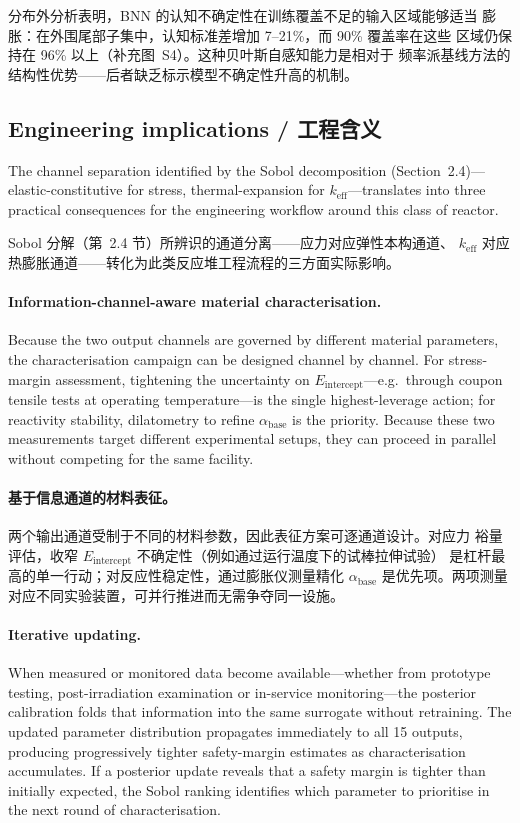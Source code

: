 \documentclass[11pt,a4paper]{article}
\newcommand{\keff}{\ensuremath{k_{\mathrm{eff}}}}
\newcommand{\Eint}{\ensuremath{E_{\mathrm{intercept}}}}
\newcommand{\abase}{\ensuremath{\alpha_{\mathrm{base}}}}
\begin{document}
分布外分析表明，BNN 的认知不确定性在训练覆盖不足的输入区域能够适当
膨胀：在外围尾部子集中，认知标准差增加 7--21\%，而 90\% 覆盖率在这些
区域仍保持在 96\% 以上（补充图~S4）。这种贝叶斯自感知能力是相对于
频率派基线方法的结构性优势——后者缺乏标示模型不确定性升高的机制。

\subsection{Engineering implications / 工程含义}

The channel separation identified by the Sobol decomposition
(Section~2.4)---elastic-constitutive for stress, thermal-expansion
for \keff{}---translates into three practical consequences for the
engineering workflow around this class of reactor.

Sobol 分解（第~2.4 节）所辨识的通道分离——应力对应弹性本构通道、
\keff{} 对应热膨胀通道——转化为此类反应堆工程流程的三方面实际影响。

\paragraph{Information-channel-aware material characterisation.}
Because the two output channels are governed by different material
parameters, the characterisation campaign can be designed channel by
channel. For stress-margin assessment, tightening the uncertainty on
\Eint{}---e.g.\ through coupon tensile tests at operating
temperature---is the single highest-leverage action; for reactivity
stability, dilatometry to refine \abase{} is the priority. Because
these two measurements target different experimental setups, they can
proceed in parallel without competing for the same facility.

\paragraph{基于信息通道的材料表征。}
两个输出通道受制于不同的材料参数，因此表征方案可逐通道设计。对应力
裕量评估，收窄 \Eint{} 不确定性（例如通过运行温度下的试棒拉伸试验）
是杠杆最高的单一行动；对反应性稳定性，通过膨胀仪测量精化 \abase{}
是优先项。两项测量对应不同实验装置，可并行推进而无需争夺同一设施。

\paragraph{Iterative updating.}
When measured or monitored data become available---whether from prototype
testing, post-irradiation examination or in-service monitoring---the
posterior calibration folds that information into the same surrogate
without retraining. The updated parameter distribution propagates
immediately to all 15 outputs, producing progressively tighter
safety-margin estimates as characterisation accumulates. If a posterior
update reveals that a safety margin is tighter than initially expected,
the Sobol ranking identifies which parameter to prioritise in the next
round of characterisation.
\end{document}
